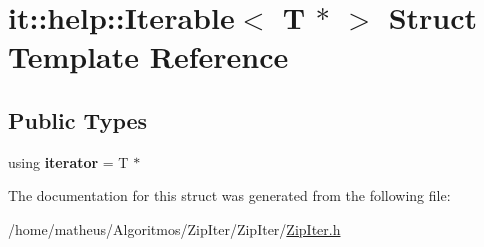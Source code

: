 \hypertarget{structit_1_1help_1_1Iterable_3_01T_01_5_01_4}{}\section{it\+:\+:help\+:\+:Iterable$<$ T $\ast$ $>$ Struct Template Reference}
\label{structit_1_1help_1_1Iterable_3_01T_01_5_01_4}
\subsection*{Public Types}
\begin{DoxyCompactItemize}
\item 
using {\bfseries iterator} = T $\ast$\hypertarget{structit_1_1help_1_1Iterable_3_01T_01_5_01_4_a8358e383286cbe494802cbbac75fd894}{}\label{structit_1_1help_1_1Iterable_3_01T_01_5_01_4_a8358e383286cbe494802cbbac75fd894}

\end{DoxyCompactItemize}


The documentation for this struct was generated from the following file\+:\begin{DoxyCompactItemize}
\item 
/home/matheus/\+Algoritmos/\+Zip\+Iter/\+Zip\+Iter/\hyperlink{ZipIter_8h}{Zip\+Iter.\+h}\end{DoxyCompactItemize}

